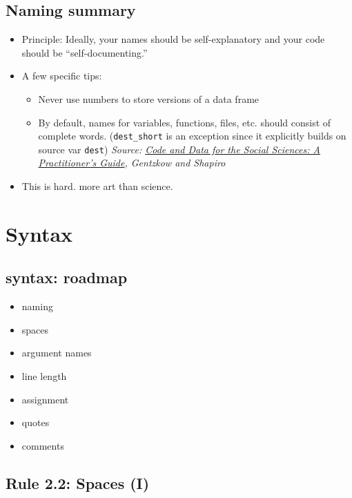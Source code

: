 \documentclass[
  letterpaper,
  DIV=11,
  numbers=noendperiod]{scrreprt}
\providecommand{\tightlist}{%
  \setlength{\itemsep}{0pt}\setlength{\parskip}{0pt}}\usepackage{longtable,booktabs,array}
\begin{document}
\hypertarget{naming-summary}{%
\subsection{Naming summary}\label{naming-summary}}

\begin{itemize}
\tightlist
\item
  Principle: Ideally, your names should be self-explanatory and your
  code should be ``self-documenting.''
\item
  A few specific tips:

  \begin{itemize}
  \tightlist
  \item
    Never use numbers to store versions of a data frame
  \item
    By default, names for variables, functions, files, etc. should
    consist of complete words. (\texttt{dest\_short} is an exception
    since it explicitly builds on source var \texttt{dest})
    \emph{Source:
    \href{https://web.stanford.edu/~gentzkow/research/CodeAndData.pdf}{Code
    and Data for the Social Sciences: A Practitioner's Guide}, Gentzkow
    and Shapiro}
  \end{itemize}
\item
  This is hard. more art than science.
\end{itemize}

\hypertarget{syntax}{%
\section{Syntax}\label{syntax}}

\hypertarget{syntax-roadmap}{%
\subsection{syntax: roadmap}\label{syntax-roadmap}}

\begin{itemize}
\tightlist
\item
  naming
\item
  spaces
\item
  argument names
\item
  line length
\item
  assignment
\item
  quotes
\item
  comments
\end{itemize}

\hypertarget{rule-2.2-spaces-i}{%
\subsection{Rule 2.2: Spaces (I)}\label{rule-2.2-spaces-i}}
\end{document}
